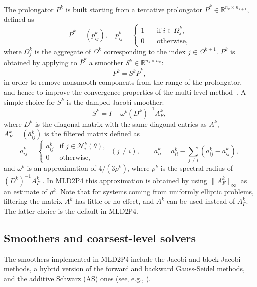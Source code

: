 The prolongator $P^k$ is built starting from a tentative prolongator
$\bar{P}^k \in \mathbb{R}^{n_k \times n_{k+1}}$, defined as
\begin{equation}
\bar{P}^k =(\bar{p}_{ij}^k), \quad  \bar{p}_{ij}^k = 
\left\{ \begin{array}{ll}
1 & \quad \mbox{if} \; i \in \Omega^k_j, \\
0 & \quad \mbox{otherwise},
\end{array} \right.
\label{eq:tent_prol}
\end{equation}
where $\Omega^k_j$ is the aggregate of $\Omega^k$
corresponding to the index $j \in \Omega^{k+1}$.
$P^k$ is obtained by applying to $\bar{P}^k$ a smoother
$S^k \in \mathbb{R}^{n_k \times n_k}$:
$$
P^k = S^k \bar{P}^k,
$$
in order to remove nonsmooth components from the range of the prolongator,
and hence to improve the convergence properties of the multi-level
method~\cite{BREZINA_VANEK,Stuben_01}.
A simple choice for $S^k$ is the damped Jacobi smoother:
\[
S^k = I - \omega^k (D^k)^{-1} A^k_F , 
\]
where $D^k$ is the diagonal matrix with the same diagonal entries as $A^k$,
$A^k_F = (\bar{a}_{ij}^k)$ is the filtered matrix defined as
\begin{equation}
\label{eq:filtered}
  \bar{a}_{ij}^k =
   \left \{ \begin{array}{ll}
   a_{ij}^k & \mbox{if } j \in \mathcal{N}_i^k(\theta), \\
   0            & \mbox{otherwise},
   \end{array} \right.
   \; (j \ne i),
   \qquad
   \bar{a}_{ii}^k = a_{ii}^k - \sum_{j \ne i} (a_{ij}^k - \bar{a}_{ij}^k),
\end{equation}
and $\omega^k$ is an approximation of $4/(3\rho^k)$, where
$\rho^k$ is the spectral radius of $(D^k)^{-1}A^k_F$ \cite{BREZINA_VANEK}.
In MLD2P4 this approximation is obtained by using $\| A^k_F \|_\infty$ as an estimate
of $\rho^k$. Note that for systems coming from uniformly elliptic
problems, filtering the matrix $A^k$ has little or no effect, and
$A^k$ can be used instead of $A^k_F$. The latter choice is the default in MLD2P4.

\subsection{Smoothers and coarsest-level solvers\label{sec:smoothers}}

The smoothers implemented in MLD2P4 include the Jacobi and block-Jacobi methods,
a hybrid version of the forward and backward Gauss-Seidel methods, and the
additive Schwarz (AS) ones (see, e.g., \cite{Saad_book,dd2_96}). 

